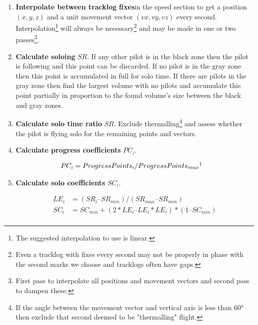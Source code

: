 \documentclass[gap.tex]{subfiles}
\begin{document}
\begin{enumerate}
    \item \textbf{Interpolate between tracklog fixes}\footnotemark in the speed
        section to get a position \((x, y, z)\) and a unit movement vector
        \((vx, vy, vz)\) every second. Interpolation\footnote{The
        suggested interpolation to use is linear.} will always be
        necessary\footnote{Even a tracklog with fixes every second may not be
        properly in phase with the second marks we choose and tracklogs often
        have gaps.} and may be made in one or two passes\footnote{First pass to
        interpolate all positions and movement vectors and second pass to
        dampen these.}.

    \item \textbf{Calculate soloing} \(SR\). If any other pilot is in the black
        zone then the pilot is following and this point can be discarded. If no
        pilot is in the gray zone then this point is accumulated in full for
        solo time. If there are pilots in the gray zone then find the largest
        volume with no pilots and accumulate this point partially in proportion
        to the found volume's size between the black and gray zones.
    
    \item \textbf{Calculate solo time ratio} \(SR\). Exclude
        thermalling\footnote{If the angle between the movement vector and
        vertical axis is less than 60° then exclude that second deemed to be
        "thermalling" flight.} and assess whether the pilot is flying solo for
        the remaining points and vectors.
    
    \item \textbf{Calculate progress coefficients} \(PC_i\).
        
        \begin{align*}
            PC_i &= ProgressPoints_i / ProgressPoints_{max}\footnotemark
        \end{align*}

    \item \textbf{Calculate solo coefficients} \(SC_i\).
        
        \begin{align*}
            LE_i &= (SR_i – SR_{min}) / (SR_{max} – SR_{min}) \\
            SC_i &= SC_{min} + (2*LE_i – LE_i * LE_i) * (1 – SC_{min}) \\
        \end{align*}
            

\end{enumerate}
\end{document}
